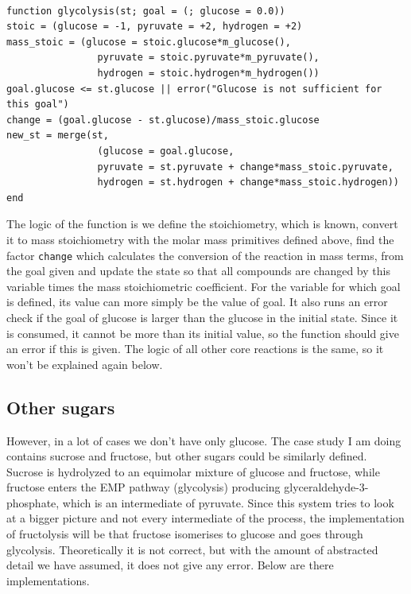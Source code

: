 \documentclass[11pt]{article}
\begin{document}
\begin{verbatim}

function glycolysis(st; goal = (; glucose = 0.0))
stoic = (glucose = -1, pyruvate = +2, hydrogen = +2)
mass_stoic = (glucose = stoic.glucose*m_glucose(),
                pyruvate = stoic.pyruvate*m_pyruvate(),
                hydrogen = stoic.hydrogen*m_hydrogen())
goal.glucose <= st.glucose || error("Glucose is not sufficient for this goal")
change = (goal.glucose - st.glucose)/mass_stoic.glucose
new_st = merge(st,
                (glucose = goal.glucose,
                pyruvate = st.pyruvate + change*mass_stoic.pyruvate,
                hydrogen = st.hydrogen + change*mass_stoic.hydrogen))
end

\end{verbatim}

The logic of the function is we define the stoichiometry, which is known, convert it to mass stoichiometry with the molar mass primitives defined above, find the factor \texttt{change} which calculates the conversion of the reaction in mass terms, from the goal given and update the state so that all compounds are changed by this variable times the mass stoichiometric coefficient. For the variable for which goal is defined, its value can more simply be the value of goal. It also runs an error check if the goal of glucose is larger than the glucose in the initial state. Since it is consumed, it cannot be more than its initial value, so the function should give an error if this is given. The logic of all other core reactions is the same, so it won't be explained again below. 

\subsection{Other sugars}
\label{sec:org61804f5}
However, in a lot of cases we don't have only glucose. The case study I am doing contains sucrose and fructose, but other sugars could be similarly defined. Sucrose is hydrolyzed to an equimolar mixture of glucose and fructose, while fructose enters the EMP pathway (glycolysis) producing glyceraldehyde-3-phosphate, which is an intermediate of pyruvate. Since this system tries to look at a bigger picture and not every intermediate of the process, the implementation of fructolysis will be that fructose isomerises to glucose and goes through glycolysis. Theoretically it is not correct, but with the amount of abstracted detail we have assumed, it does not give any error. Below are there implementations.
\end{document}
